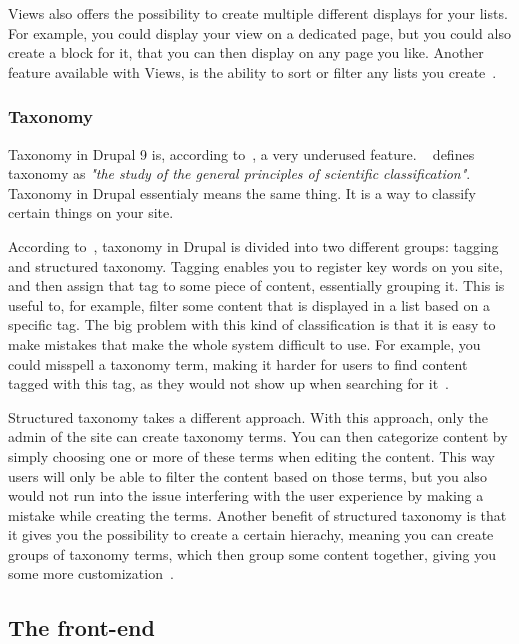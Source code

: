 Views also offers the possibility to create multiple different displays for your lists. For example, you could display your view on a dedicated page, but you could also create a block for it, that you can then display on any page you like. Another feature available with Views, is the ability to sort or filter any lists you create~\autocite{Tomlinson2015}.

\subsubsection{Taxonomy}

Taxonomy in Drupal 9 is, according to~\textcite{Tomlinson2015}, a very underused feature. ~\textcite{MerriamWebsterTax} defines taxonomy as \emph{"the study of the general principles of scientific classification"}. Taxonomy in Drupal essentialy means the same thing. It is a way to classify certain things on your site.

According to~\textcite{Tomlinson2015}, taxonomy in Drupal is divided into two different groups: tagging and structured taxonomy. Tagging enables you to register key words on you site, and then assign that tag to some piece of content, essentially grouping it. This is useful to, for example, filter some content that is displayed in a list based on a specific tag. The big problem with this kind of classification is that it is easy to make mistakes that make the whole system difficult to use. For example, you could misspell a taxonomy term, making it harder for users to find content tagged with this tag, as they would not show up when searching for it~\autocite{Tomlinson2015}.

Structured taxonomy takes a different approach. With this approach, only the admin of the site can create taxonomy terms. You can then categorize content by simply choosing one or more of these terms when editing the content. This way users will only be able to filter the content based on those terms, but you also would not run into the issue interfering with the user experience by making a mistake while creating the terms. Another benefit of structured taxonomy is that it gives you the possibility to create a certain hierachy, meaning you can create groups of taxonomy terms, which then group some content together, giving you some more customization~\autocite{Tomlinson2015}.


\subsection{The front-end}

